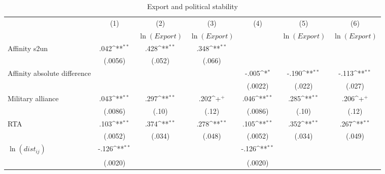 \begin{table} \footnotesize \begin{threeparttable} \caption{Export and political stability}         \label{table:gravity1} \centering        {}         \begin{tabular}{l*{6}{c}} \toprule \toprule
                    &\multicolumn{1}{c}{(1)}        &\multicolumn{1}{c}{(2)}        &\multicolumn{1}{c}{(3)}        &\multicolumn{1}{c}{(4)}        &\multicolumn{1}{c}{(5)}        &\multicolumn{1}{c}{(6)}        \\
                    &                    &$\ln(Export)$        &$\ln(Export)$        &                    &$\ln(Export)$        &$\ln(Export)$        \\
\midrule 
Affinity s2un       &        .042\sym{**}&        .428\sym{**}&        .348\sym{**}&                    &                    &                    \\
                    &     (.0056)        &      (.052)        &      (.066)        &                    &                    &                    \\
Affinity absolute difference&                    &                    &                    &       -.005\sym{*} &       -.190\sym{**}&       -.113\sym{**}\\
                    &                    &                    &                    &     (.0022)        &      (.022)        &      (.027)        \\
Military alliance   &        .043\sym{**}&        .297\sym{**}&        .202\sym{+} &        .046\sym{**}&        .285\sym{**}&        .206\sym{+} \\
                    &     (.0086)        &       (.10)        &       (.12)        &     (.0086)        &       (.10)        &       (.12)        \\
RTA                 &        .103\sym{**}&        .374\sym{**}&        .278\sym{**}&        .105\sym{**}&        .352\sym{**}&        .267\sym{**}\\
                    &     (.0052)        &      (.034)        &      (.048)        &     (.0052)        &      (.034)        &      (.049)        \\
$\ln(dist_{ij})$    &       -.126\sym{**}&                    &                    &       -.126\sym{**}&                    &                    \\
                    &     (.0020)        &                    &                    &     (.0020)        &                    &                    \\

\end{tabular}
\end{threeparttable}
\end{table}
